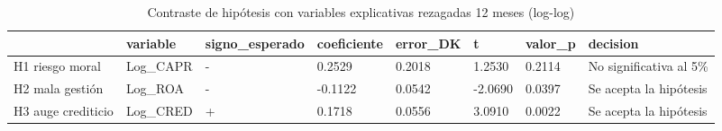 \begin{table}[htbp]
\centering
\caption{Contraste de hipótesis con variables explicativas rezagadas 12 meses (log-log)}
\begin{tabular}{llllllll}
\hline
 & variable & signo\_esperado & coeficiente & error\_DK & t & valor\_p & decision \\
\hline
H1 riesgo moral & Log\_CAPR & - & 0.2529 & 0.2018 & 1.2530 & 0.2114 & No significativa al 5\% \\
H2 mala gestión & Log\_ROA & - & -0.1122 & 0.0542 & -2.0690 & 0.0397 & Se acepta la hipótesis \\
H3 auge crediticio & Log\_CRED & + & 0.1718 & 0.0556 & 3.0910 & 0.0022 & Se acepta la hipótesis \\
\hline
\end{tabular}
\label{tab:tabla7b_hipotesis_rezago12}
\end{table}